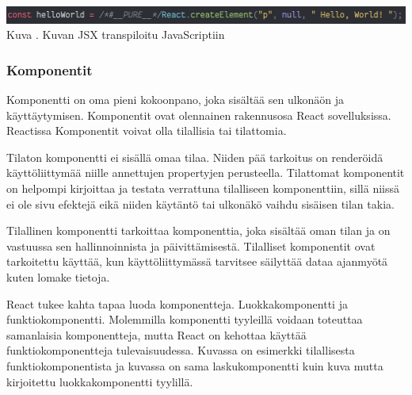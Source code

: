 \bigskip
\includegraphics[width=15cm]{src/public/oppar/transpiled_jsx_example.png}\\
Kuva \getImgCount {}. Kuvan \prevImageCount{} JSX transpiloitu JavaScriptiin
\medskip





\subsubsection{Komponentit}










Komponentti on oma pieni kokoonpano, joka sisältää sen ulkonäön ja käyttäytymisen.
Komponentit ovat olennainen rakennusosa React sovelluksissa.
Reactissa Komponentit voivat olla tilallisia tai tilattomia. 
\medskip



Tilaton komponentti ei sisällä omaa tilaa. 
Niiden pää tarkoitus on renderöidä käyttöliittymää niille annettujen propertyjen perusteella.
Tilattomat komponentit on helpompi kirjoittaa ja testata verrattuna tilalliseen komponenttiin, 
sillä niissä ei ole sivu efektejä eikä niiden käytäntö tai ulkonäkö vaihdu sisäisen tilan takia.
\medskip


Tilallinen komponentti tarkoittaa komponenttia, 
joka sisältää oman tilan ja on vastuussa sen hallinnoinnista ja päivittämisestä.
Tilalliset komponentit ovat tarkoitettu käyttää, kun käyttöliittymässä tarvitsee säilyttää dataa ajanmyötä 
kuten lomake tietoja.\\
\medskip







React tukee kahta tapaa luoda komponentteja. Luokkakomponentti ja funktiokomponentti.
Molemmilla komponentti tyyleillä voidaan toteuttaa samanlaisia komponentteja, mutta React on kehottaa käyttää funktiokomponentteja tulevaisuudessa. 
Kuvassa \nextImageCount {} on esimerkki tilallisesta funktiokomponentista ja
kuvassa \nextnextImageCount {} on sama laskukomponentti kuin kuva \nextImageCount{} mutta kirjoitettu luokkakomponentti tyylillä. 
\medskip


